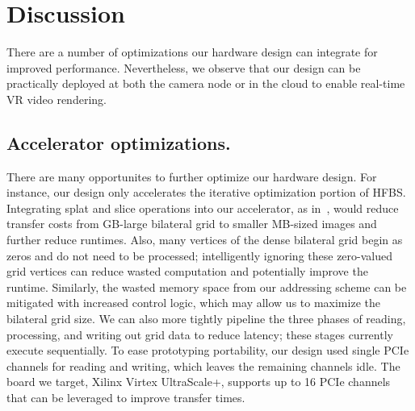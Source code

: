 \section{Discussion}
There are a number of optimizations our hardware design can integrate for improved performance.
Nevertheless, we observe that our design can be practically deployed at both the camera node or in the cloud to enable real-time VR video rendering.


\subsection{Accelerator optimizations.}
There are many opportunites to further optimize our hardware design.
For instance, our design only accelerates the iterative optimization portion of HFBS.
Integrating splat and slice operations into our accelerator, as in~\cite{bilat_isscc}, would reduce transfer costs from GB-large bilateral grid to smaller MB-sized images and further reduce runtimes.
Also, many vertices of the dense bilateral grid begin as zeros and do not need to be processed;  intelligently ignoring these zero-valued grid vertices can reduce wasted computation and potentially improve the runtime.
Similarly, the wasted memory space from our addressing scheme can be mitigated with increased control logic, which may allow us to maximize the bilateral grid size.
We can also more tightly pipeline the three phases of reading, processing, and writing out grid data to reduce latency; these stages currently execute sequentially.
To ease prototyping portability, our design used single PCIe channels for reading and writing, which leaves the remaining channels idle.
The board we target, Xilinx Virtex UltraScale+, supports up to 16 PCIe channels that can be leveraged to improve transfer times.

